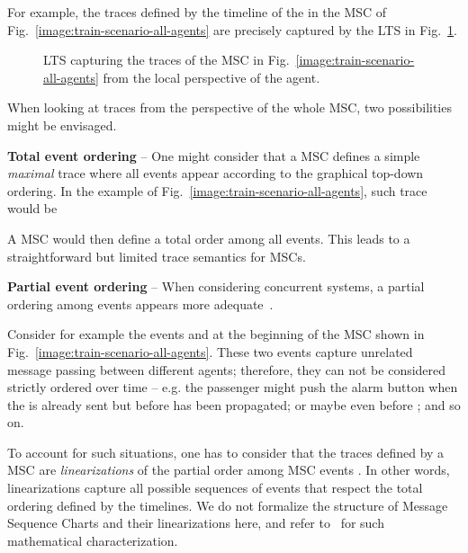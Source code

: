For example, the traces defined by the timeline of the  in the MSC of Fig.~\ref{image:train-scenario-all-agents} are precisely captured by the LTS in Fig.~\ref{image:local-traces-lts}. 

\begin{figure}\centering
{}
\caption{LTS capturing the traces of the MSC in Fig.~\ref{image:train-scenario-all-agents} from the local perspective of the  agent.\label{image:local-traces-lts}}
\end{figure}

When looking at traces from the perspective of the whole MSC, two possibilities might be envisaged.

\noindent \textbf{Total event ordering} -- One might consider that a MSC defines a simple \emph{maximal} trace where all events appear according to the graphical top-down ordering. In the example of Fig.~\ref{image:train-scenario-all-agents}, such trace would be

\begin{center}\end{center} 

A MSC would then define a total order among all events. This leads to a straightforward but limited trace semantics for MSCs.

\noindent \textbf{Partial event ordering} -- When considering concurrent systems, a partial ordering among events appears more adequate~\cite{ITU:1996, Uchitel:2003}. 

Consider for example the events  and  at the beginning of the MSC shown in Fig.~\ref{image:train-scenario-all-agents}. These two events capture unrelated message passing between different agents; therefore, they can not be considered strictly ordered over time -- e.g. the passenger might push the alarm button when the  is already sent but before  has been propagated; or maybe even before ; and so on. 

To account for such situations, one has to consider that the traces defined by a MSC are \emph{linearizations} of the partial order among MSC events \cite{Alur:2000}. In other words, linearizations capture all possible sequences of events that respect the total ordering defined by the timelines. We do not formalize the structure of Message Sequence Charts and their linearizations here, and refer to~\cite{Uchitel:2003} for such mathematical characterization. 

